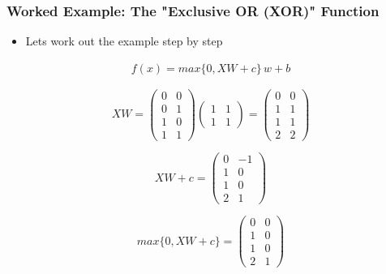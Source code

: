 \documentclass[
  shownotes,
  xcolor={svgnames},
  hyperref={colorlinks,citecolor=DarkBlue,linkcolor=DarkRed,urlcolor=DarkBlue}
  , aspectratio=169]{beamer}
\begin{document}
\begin{frame}
\frametitle{Worked Example: The "Exclusive OR (XOR)" Function}

\begin{itemize}
\item Lets work out the example step by step
\end{itemize}
\begin{align}
f(x)=max\{0,XW+c\}\,w+b
\end{align}

\[
XW=\left(\begin{array}{cc}
0 & 0\\
0 & 1\\
1 & 0\\
1 & 1
\end{array}\right)\left(\begin{array}{cc}
1 & 1\\
1 & 1
\end{array}\right)=\left(\begin{array}{cc}
0 & 0\\
1 & 1\\
1 & 1\\
2 & 2
\end{array}\right)
\]

\[
XW+c=\left(\begin{array}{cc}
0 & -1\\
1 & 0\\
1 & 0\\
2 & 1
\end{array}\right)
\]

\[
max\{0,XW+c\}=\left(\begin{array}{cc}
0 & 0\\
1 & 0\\
1 & 0\\
2 & 1
\end{array}\right)
\]

\end{frame}
\end{document}
